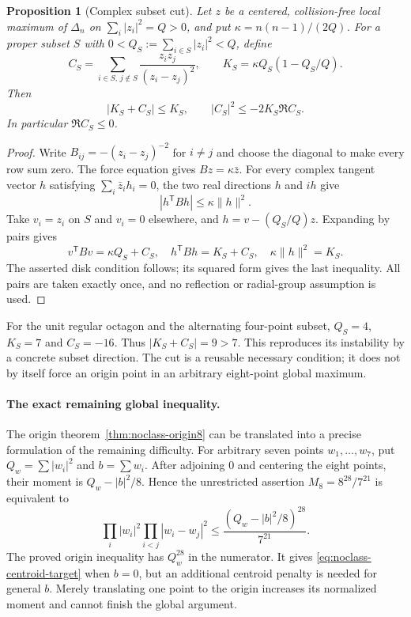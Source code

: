 \documentclass[11pt]{article}
\newtheorem{proposition}[theorem]{Proposition}
\theoremstyle{remark}
\numberwithin{equation}{section}
\begin{document}
\begin{proposition}[Complex subset cut]\label{prop:noclass-complex-cut}
Let $z$ be a centered, collision-free local maximum of $\Delta_n$ on
$\sum_i|z_i|^2=Q>0$, and put $\kappa=n(n-1)/(2Q)$. For a proper subset
$S$ with $0<Q_S:=\sum_{i\in S}|z_i|^2<Q$, define
\[
 C_S=\sum_{i\in S,\,j\notin S}
       \frac{z_i z_j}{(z_i-z_j)^2},\qquad
 K_S=\kappa Q_S(1-Q_S/Q).
\]
Then
\[
 |K_S+C_S|\le K_S,
 \qquad |C_S|^2\le-2K_S\Re C_S.
\]
In particular $\Re C_S\le0$.
\end{proposition}
\begin{proof}
Write $B_{ij}=-(z_i-z_j)^{-2}$ for $i\ne j$ and choose the diagonal
to make every row sum zero. The force equation gives
$Bz=\kappa\bar z$. For every complex tangent vector $h$ satisfying
$\sum_i\bar z_i h_i=0$, the two real directions $h$ and $ih$ give
\[
 |h^{\mathsf T}Bh|\le\kappa\|h\|^2.
\]
Take $v_i=z_i$ on $S$ and $v_i=0$ elsewhere, and
$h=v-(Q_S/Q)z$. Expanding by pairs gives
\[
 v^{\mathsf T}Bv=\kappa Q_S+C_S,
 \quad h^{\mathsf T}Bh=K_S+C_S,
 \quad \kappa\|h\|^2=K_S.
\]
The asserted disk condition follows; its squared form gives the last
inequality. All pairs are taken exactly once, and no reflection or
radial-group assumption is used.
\end{proof}

For the unit regular octagon and the alternating four-point subset,
$Q_S=4$, $K_S=7$ and $C_S=-16$. Thus $|K_S+C_S|=9>7$.
This reproduces its instability by a concrete subset direction.
The cut is a reusable necessary condition; it does not by itself force
an origin point in an arbitrary eight-point global maximum.

\paragraph{The exact remaining global inequality.}
The origin theorem~\ref{thm:noclass-origin8} can be translated into a
precise formulation of the remaining difficulty. For arbitrary seven
points $w_1,\ldots,w_7$, put $Q_w=\sum|w_i|^2$ and $b=\sum w_i$.
After adjoining $0$ and centering the eight points, their moment is
$Q_w-|b|^2/8$. Hence the unrestricted assertion $M_8=8^{28}/7^{21}$
is equivalent to
\begin{equation}\label{eq:noclass-centroid-target}
 \prod_i|w_i|^2\prod_{i<j}|w_i-w_j|^2
 \le \frac{(Q_w-|b|^2/8)^{28}}{7^{21}}.
\end{equation}
The proved origin inequality has $Q_w^{28}$ in the numerator. It gives
\eqref{eq:noclass-centroid-target} when $b=0$, but an additional
centroid penalty is needed for general $b$. Merely translating one
point to the origin increases its normalized moment and cannot finish
the global argument.
\end{document}
